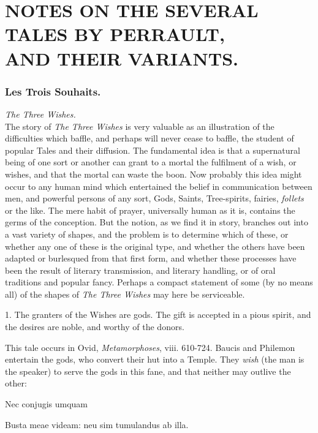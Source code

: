 \documentclass[14pt,a4paper]{memoir}
\begin{document}
\hypertarget{4533318093929944247_33931-h-0.htm.xhtmlux5cux23pgepubid00011}{%
\chapter*{NOTES ON THE SEVERAL TALES BY
PERRAULT, \\ AND THEIR VARIANTS.}\label{4533318093929944247_33931-h-0.htm.xhtmlux5cux23pgepubid00011}}

\subsection{Les Trois Souhaits.}

\emph{The Three Wishes.} \\

The story of \emph{The Three Wishes} is very valuable as an illustration
of the difficulties which baffle, and perhaps will never cease to
baffle, the student of popular Tales and their diffusion. The
fundamental idea is that a supernatural being of one sort or another can
grant to a mortal the fulfilment of a wish, or wishes, and that the
mortal can waste the boon. Now probably this idea might occur to any
human mind which entertained the belief in communication between men,
and powerful persons of any sort, Gods, Saints, Tree-spirits, fairies,
\emph{follets} or the like. The mere habit of prayer, universally human
as it is, contains the germs of the conception. But the notion, as we
find it in story, branches out into a vast variety of shapes, and the
problem is to determine which of these, or whether any one of these is
the original type, and whether the others have been adapted or
burlesqued from that first form, and whether these processes have been
the result of literary transmission, and literary handling, or of oral
traditions and popular fancy. Perhaps a compact statement of some (by no
means all) of the shapes of \emph{The Three Wishes} may here be
serviceable.

1. The granters of the Wishes are gods. The gift is accepted in a pious
spirit, and the desires are noble, and worthy of the donors.

This tale occurs in Ovid, \emph{Metamorphoses}, viii. 610-724. Baucis
and Philemon entertain the gods, who convert their hut into a Temple.
They \emph{wish} (the man is the speaker) to serve the gods in this
fane, and that neither may outlive the other:

\centerline{Nec conjugis umquam} \centerline{Busta meae videam: neu sim tumulandus ab illa.}
\end{document}
